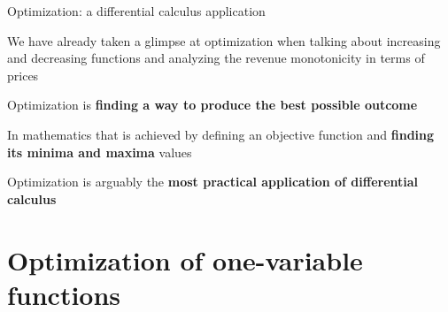 \documentclass[9pt]{beamer}
\begin{document}

\begin{frame}{Optimization: a differential calculus application}
    
    We have already taken a glimpse at optimization when talking about increasing and decreasing functions and analyzing the revenue monotonicity in terms of prices
    \vspace{0.2cm}

    Optimization is \textbf{finding a way to produce the best possible outcome}
    \vspace{0.2cm}

    In mathematics that is achieved by defining an objective function and \textbf{finding its minima and maxima} values
    \vspace{0.2cm}

    Optimization is arguably the \textbf{most practical application of differential calculus}  
    
\end{frame}

\section{Optimization of one-variable functions}
\end{document}
